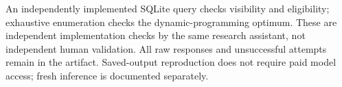 An independently implemented SQLite query checks visibility and eligibility; exhaustive enumeration checks the dynamic-programming optimum. These are independent implementation checks by the same research assistant, not independent human validation. All raw responses and unsuccessful attempts remain in the artifact. Saved-output reproduction does not require paid model access; fresh inference is documented separately.
